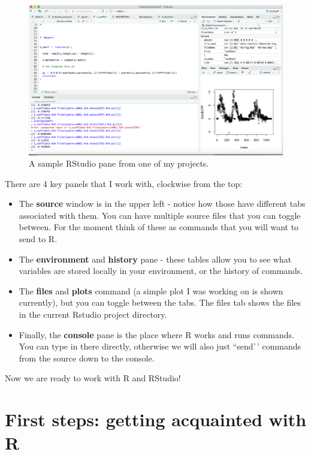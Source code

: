 \documentclass[
]{book}
\providecommand{\tightlist}{%
  \setlength{\itemsep}{0pt}\setlength{\parskip}{0pt}}
\theoremstyle{definition}
\theoremstyle{definition}
\theoremstyle{definition}
\theoremstyle{remark}
\begin{document}
\begin{figure}

{\centering \includegraphics[width=5in]{figures/02-intro/rStudio-pane} 

}

\caption{A sample RStudio pane from one of my projects.}\label{fig:r-studio-pane}
\end{figure}

There are 4 key panels that I work with, clockwise from the top:

\begin{itemize}
\tightlist
\item
  The \textbf{source} window is in the upper left - notice how those have different tabs associated with them. You can have multiple source files that you can toggle between. For the moment think of these as commands that you will want to send to R.
\item
  The \textbf{environment} and \textbf{history} pane - these tables allow you to see what variables are stored locally in your environment, or the history of commands.
\item
  The \textbf{files} and \textbf{plots} command (a simple plot I was working on is shown currently), but you can toggle between the tabs. The files tab shows the files in the current Rstudio project directory.
\item
  Finally, the \textbf{console} pane is the place where R works and runs commands. You can type in there directly, otherwise we will also just ``send'\,' commands from the source down to the console.
\end{itemize}

Now we are ready to work with R and RStudio!

\hypertarget{first-steps-getting-acquainted-with-r}{%
\section{First steps: getting acquainted with R}\label{first-steps-getting-acquainted-with-r}}
\end{document}

